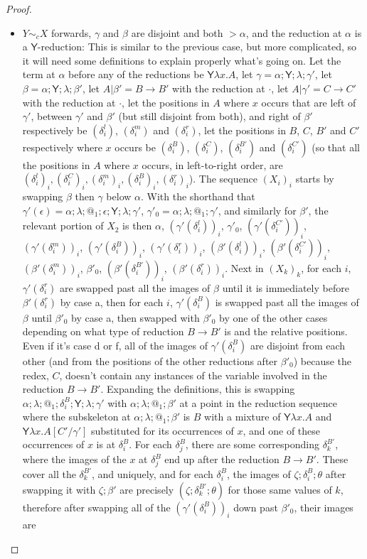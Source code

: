 \documentclass{article}
\newcommand{\tY}{\mathsf{Y}}
\theoremstyle{definition}
\theoremstyle{lemma}
\theoremstyle{remark}
\begin{document}
\begin{proof}
\begin{itemize}
\item $Y \sim_c X$ forwards, $\gamma$ and $\beta$ are disjoint and both $> \alpha$, and the reduction at $\alpha$ is a $\tY$-reduction: This is similar to the previous case, but more complicated, so it will need some definitions to explain properly what's going on. Let the term at $\alpha$ before any of the reductions be $\tY \lambda x. A$, let $\gamma = \alpha;\tY;\lambda;\gamma'$, let $\beta = \alpha;\tY;\lambda;\beta'$, let $A | \beta' = B \to B'$ with the reduction at $\cdot$, let $A | \gamma' = C \to C'$ with the reduction at $\cdot$, let the positions in $A$ where $x$ occurs that are left of $\gamma'$, between $\gamma'$ and $\beta'$ (but still disjoint from both), and right of $\beta'$ respectively be $(\delta^l_i)$, $(\delta^m_i)$ and $(\delta^r_i)$, let the positions in $B$, $C$, $B'$ and $C'$ respectively where $x$ occurs be $(\delta^B_i)$, $(\delta^C_i)$, $(\delta^{B'}_i)$ and $(\delta^{C'}_i)$ (so that all the positions in $A$ where $x$ occurs, in left-to-right order, are $(\delta^l_i)_i, (\delta^C_i)_i, (\delta^m_i)_i, (\delta^B_i)_i, (\delta^r_i)_i$). The sequence $(X_i)_i$ starts by swapping $\beta$ then $\gamma$ below $\alpha$. With the shorthand that $\gamma'(\epsilon) = \alpha;\lambda;@_1;\epsilon;\tY;\lambda;\gamma'$, $\gamma'_0 = \alpha;\lambda;@_1;\gamma'$, and similarly for $\beta'$, the relevant portion of $X_2$ is then $\alpha$, $(\gamma'(\delta^l_i))_i$, $\gamma'_0$, $(\gamma'(\delta^{C'}_i))_i$, $(\gamma'(\delta^m_i))_i$, $(\gamma'(\delta^B_i))_i$, $(\gamma'(\delta^r_i))_i$, $(\beta'(\delta^l_i))_i$, $(\beta'(\delta^{C'}_i))_i$, $(\beta'(\delta^m_i))_i$, $\beta'_0$, $(\beta'(\delta^{B'}_i))_i$, $(\beta'(\delta^r_i))_i$. Next in $(X_k)_k$, for each $i$, $\gamma'(\delta^r_i)$ are swapped past all the images of $\beta$ until it is immediately before $\beta'(\delta^r_i)$ by case a, then for each $i$, $\gamma'(\delta^B_i)$ is swapped past all the images of $\beta$ until $\beta'_0$ by case a, then swapped with $\beta'_0$ by one of the other cases depending on what type of reduction $B \to B'$ is and the relative positions. Even if it's case d or f, all of the images of $\gamma'(\delta^B_i)$ are disjoint from each other (and from the positions of the other reductions after $\beta'_0$) because the redex, $C$, doesn't contain any instances of the variable involved in the reduction $B \to B'$. Expanding the definitions, this is swapping $\alpha;\lambda;@_1;\delta^B_i;\tY;\lambda;\gamma'$ with $\alpha;\lambda;@_1;\beta'$ at a point in the reduction sequence where the subskeleton at $\alpha;\lambda;@_1;\beta'$ is $B$ with a mixture of $\tY \lambda x. A$ and $\tY \lambda x. A[C'/\gamma']$ substituted for its occurrences of $x$, and one of these occurrences of $x$ is at $\delta^B_i$. For each $\delta^B_j$, there are some corresponding $\delta^{B'}_k$, where the images of the $x$ at $\delta^B_j$ end up after the reduction $B \to B'$. These cover all the $\delta^{B'}_k$, and uniquely, and for each $\delta^B_i$, the images of $\zeta;\delta^B_i;\theta$ after swapping it with $\zeta;\beta'$ are precisely $(\zeta;\delta^{B'}_k;\theta)$ for those same values of $k$, therefore after swapping all of the $(\gamma'(\delta^B_i))_i$ down past $\beta'_0$, their images are 
\end{itemize}
\end{proof}
\end{document}
